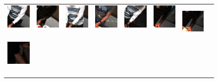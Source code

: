 \documentclass[runningheads]{llncs}
\begin{document}
\begin{figure}[t]
\begin{center}
\begin{tabular}{@{}c@{}c@{}c@{}c@{}c@{}c@{}c@{}c@{}}
\includegraphics[height=0.1375\linewidth]{figures/biposelets/poselet-230/sample-1-f0.jpg}\,&
\includegraphics[height=0.1375\linewidth]{figures/biposelets/poselet-230/sample-2-f0.jpg}\,&
\includegraphics[height=0.1375\linewidth]{figures/biposelets/poselet-230/sample-3-f0.jpg}\,&
\includegraphics[height=0.1375\linewidth]{figures/biposelets/poselet-230/sample-4-f0.jpg}\,&
\includegraphics[height=0.1375\linewidth]{figures/biposelets/poselet-230/sample-5-f0.jpg}\,&
\includegraphics[height=0.1375\linewidth]{figures/biposelets/poselet-230/sample-6-f0.jpg}\,&
\includegraphics[height=0.1375\linewidth]{figures/biposelets/poselet-230/sample-7-f0.jpg}\\
%
\includegraphics[height=0.1375\linewidth]{figures/biposelets/poselet-289/sample-1-f0.jpg}\,&

\end{tabular}
\end{center}
\end{figure}
\end{document}
